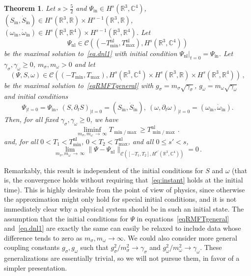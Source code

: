 \documentclass[10pt]{amsart}
\newtheorem{theo}{Theorem}[section]
\theoremstyle{definition}\newtheorem{defi}[theo]{Definition}\newtheorem{rema}[theo]{Remark}\newtheorem{exam}[theo]{Example}\newtheorem{exem}[theo]{Example}\newtheorem{nota}[theo]{Notation}
\newcommand{\rmin}{\mathrm{in}}
\newcommand{\nl}{\mathrm{nl}}
\newcommand{\cC}{\mathcal{C}}
\newcommand\R{\mathbb{R}}
\newcommand\C{\mathbb{C}}
\begin{document}
\begin{theo}\label{thm.main1}
Let $s>\tfrac52$ and $\Psi_\rmin\in H^s(\R^3, \C^4)$, $(S_\rmin,\dot{S}_\rmin)\in H^s(\R^3, \R)\times H^{s-1}(\R^3, \R)$, $(\omega_\rmin,\dot{\omega}_\rmin)\in H^s(\R^3, \R^4)\times H^{s-1}(\R^3, \R^4)$. Let
\begin{equation*}
\Psi_\nl\in\cC\left(\left(-T_{\min}^{\nl}, T_{\max}^{\nl}\right),H^s\left(\R^3, \C^4\right)\right)
\end{equation*}
be the maximal solution to~\eqref{eq.dnl1} with initial condition $\Psi_\nl\vert_{t=0}=\Psi_\rmin$. Let $\gamma_\sigma, \gamma_\omega \geq 0$, $m_\sigma, m_\omega>0$ and let
\[
(\Psi,S,\omega)\in \cC\left((-T_{\min}, T_{\max}),H^s\left(\R^3, \C^4\right)\times H^s\left(\R^3,\R\right)\times H^s\left(\R^3, \R^4\right)\right)\,,
\]
be the maximal solution to~\eqref{eqRMFTgeneral} with $g_\sigma=m_\sigma\sqrt{\gamma_\sigma}$, $g_\omega=m_\omega\sqrt{\gamma_\omega}$ and initial conditions
\begin{equation*}
\Psi_{|t=0}=\Psi_\rmin,\ (S,\partial_t S)_{|t=0}= (S_\rmin,\dot{S}_\rmin), \ (\omega,\partial_t \omega)_{|t=0}= (\omega_\rmin,\dot{\omega}_\rmin).
\end{equation*}
Then, for all fixed $\gamma_\sigma, \gamma_\omega \geq 0$, we have
\[
\liminf_{m_\sigma, m_\omega\,\to\,\infty}T_{\min/\max}\geq T_{\min/\max}^{\nl}\,.
\]
and, for all $0<T_1<T_{\min}^{\nl}$, $0<T_2<T_{\max}^{\nl}$, and all $0\leq s'<s$,
\[
\lim_{m_\sigma, m_\omega\,\to\,\infty}\|\Psi-\Psi_{\nl}\|_{\cC\left([-T_1, T_2],H^{s'}\left(\R^3, \C^4\right)\right)}=0\,.
\]
\end{theo}

Remarkably, this result is independent of the initial conditions for $S$ and $\omega$ (that is, the convergence holds without requiring that~\eqref{eq:instant} holds at the initial time). This is highly desirable from the point of view of physics, since otherwise the approximation might only hold for special initial conditions, and it is not immediately clear why a physical system should be in such an initial state. The assumption that the initial conditions for $\Psi$ in equations~\eqref{eqRMFTgeneral} and~\eqref{eq.dnl1} are exactly the same can easily be relaxed to include data whose difference tends to zero as $m_\sigma, m_\omega \to \infty$. We could also consider more general coupling constants $g_\sigma, g_\omega$ such that $g_\sigma^2/m_\sigma^2\to \gamma_\sigma$ and $g_\omega^2/m_\omega^2\to\gamma_\omega$. These generalizations are essentially trivial, so we will not pursue them, in favor of a simpler presentation.
\end{document}
